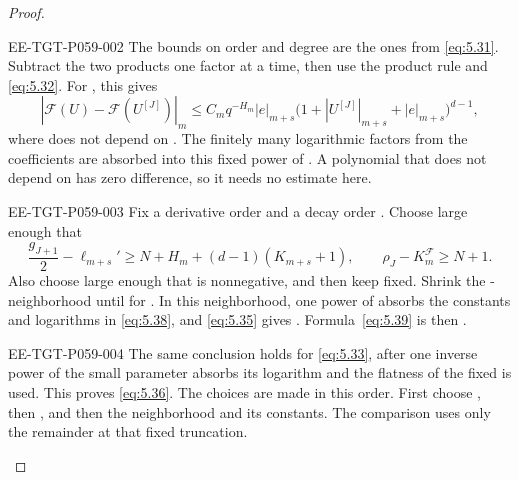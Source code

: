 \begin{proof}
\begin{EESegment}{EE-TGT-P059-002}
The bounds  on order and degree are the ones from \eqref{eq:5.31}. Subtract the two products
one factor at a time, then use the product rule and \eqref{eq:5.32}. For
, this gives
\begin{equation}
 |\mathcal F(U)-\mathcal F(U^{[J]})|_m
 \leq C_mq^{-H_m}|e|_{m+s}
 \bigl(1+|U^{[J]}|_{m+s}+|e|_{m+s}\bigr)^{d-1},
 \tag{5.39}\label{eq:5.39}
\end{equation}
where  does not depend on . The finitely many logarithmic factors from
the coefficients are absorbed into this fixed power of . A polynomial that does not depend
on  has zero difference, so it needs no estimate here.
\end{EESegment}

\begin{EESegment}{EE-TGT-P059-003}
Fix a derivative order  and a decay order . Choose
 large enough that
\[
 \frac{g_{J+1}}2-\ell_{m+s}'
 \geq N+H_m+(d-1)(K_{m+s}+1),
 \qquad
 \rho_J-K_m^{\mathcal F}\geq N+1.
\]
Also choose  large enough that
 is nonnegative, and then keep
 fixed. Shrink the -neighborhood until
 for . In this neighborhood, one power of
 absorbs the constants and logarithms in \eqref{eq:5.38}, and \eqref{eq:5.35} gives
. Formula~\eqref{eq:5.39} is then
.
\end{EESegment}

\begin{EESegment}{EE-TGT-P059-004}
The same conclusion holds for \eqref{eq:5.33}, after one inverse power of the small parameter absorbs its logarithm and the
flatness of the fixed  is used. This proves \eqref{eq:5.36}. The choices are made in this
order. First choose , then , and then the neighborhood and its
constants. The comparison uses only the remainder  at that fixed truncation.
\end{EESegment}
\end{proof}

